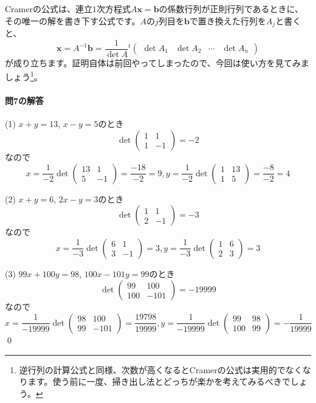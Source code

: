 Cramerの公式は、連立$1$次方程式$A \bm{x} = \bm{b}$の係数行列が正則行列であるときに、その唯一の解を書き下す公式です。$A$の$j$列目を$\bm{b}$で置き換えた行列を$A_j$と書くと、
\[
\bm{x} = A^{-1} \bm{b} = \frac{1}{\det A} {}^t
\begin{pmatrix}
\det A_1 & \det A_2 & \cdots & \det A_n
\end{pmatrix}
\]
が成り立ちます。証明自体は前回やってしまったので、今回は使い方を見てみましょう\footnote{逆行列の計算公式と同様、次数が高くなるとCramerの公式は実用的でなくなります。使う前に一度、掃き出し法とどっちが楽かを考えてみるべきでしょう。}。

\paragraph{問7の解答}

(1) $x + y = 13$, $x - y = 5$のとき
\[
\det
\begin{pmatrix}
1 & 1 \\
1 & -1
\end{pmatrix}
= -2
\]
なので
\[
x = \frac{1}{-2} \det
\begin{pmatrix}
13 & 1 \\
5 & -1
\end{pmatrix}
= \frac{-18}{-2} = 9, 
y = \frac{1}{-2} \det
\begin{pmatrix}
1 & 13 \\
1 & 5
\end{pmatrix}
= \frac{-8}{-2} = 4
\]

\noindent (2) $x + y = 6$, $2x - y = 3$のとき
\[
\det
\begin{pmatrix}
1 & 1 \\
2 & -1
\end{pmatrix}
= -3
\]
なので
\[
x = \frac{1}{-3} \det
\begin{pmatrix}
6 & 1 \\
3 & -1
\end{pmatrix}
= 3, 
y = \frac{1}{-3} \det
\begin{pmatrix}
1 & 6 \\
2 & 3
\end{pmatrix}
= 3
\]

\noindent (3) $99 x + 100 y = 98$, $100 x - 101 y = 99$のとき
\[
\det
\begin{pmatrix}
99 & 100 \\
100 & -101
\end{pmatrix}
= -19999
\]
なので
\[
x = \frac{1}{-19999} \det
\begin{pmatrix}
98 & 100 \\
99 & -101
\end{pmatrix}
= \frac{19798}{19999}, 
y = \frac{1}{-19999} \det
\begin{pmatrix}
99 & 98 \\
100 & 99
\end{pmatrix}
= -\frac{1}{19999}
\]
\qed

